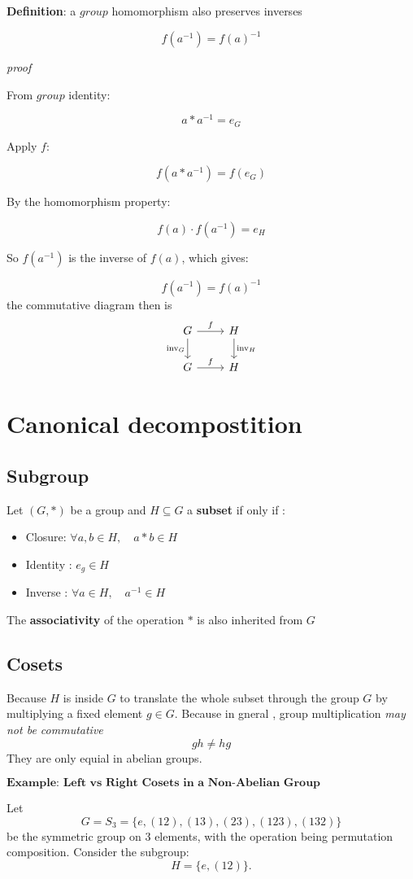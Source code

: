 \documentclass[12pt]{article}
\begin{document}
\textbf{Definition}: a $group$ homomorphism also preserves inverses

$$
f(a^{-1}) = f(a)^{-1}
$$

\textit{proof}

From $group$ identity: 

$$
a * a^{-1} = e_G
$$

Apply $f$:

$$
f(a * a^{-1}) = f(e_G)
$$

By the homomorphism property:

$$
f(a) \cdot f(a^{-1}) = e_H
$$

So $f(a^{-1})$ is the inverse of $f(a)$, which gives:

$$
f(a^{-1}) = f(a)^{-1}
$$
the commutative diagram then is 
$$
\begin{tikzcd}
	G \arrow[r, "f"] \arrow[d, "\mathrm{inv}_G"'] & H \arrow[d, "\mathrm{inv}_H"] \\
	G \arrow[r, "f"] & H
\end{tikzcd}
$$

\section*{Canonical decompostition}
\subsection*{Subgroup}
Let $(G,*)$ be a group and $H \subseteq G$ a \textbf{subset} if only if :
\begin{itemize}
	\item Closure: $\forall a,b \in H, \quad a*b \in H$
	\item Identity : $e_g \in H$
	\item Inverse : $\forall a \in H, \quad a^{-1} \in H$
\end{itemize}
The \textbf{associativity} of the operation $*$ is also inherited from $G$
\subsection*{Cosets}
Because $H$ is inside $G$ to translate the whole subset through the group $G$ by multiplying a fixed element $g \in G$. Because in gneral , group multiplication \textit{may not be commutative} 
$$
gh \neq hg
$$
They are only equial in abelian groups.


$\textbf{Example: Left vs Right Cosets in a Non-Abelian Group}$

Let  
$$
G = S_3 = \{ e, (12), (13), (23), (123), (132) \}
$$
be the symmetric group on 3 elements, with the operation being permutation composition.  
Consider the subgroup:  
$$
H = \{ e, (12) \}.
$$
\end{document}
